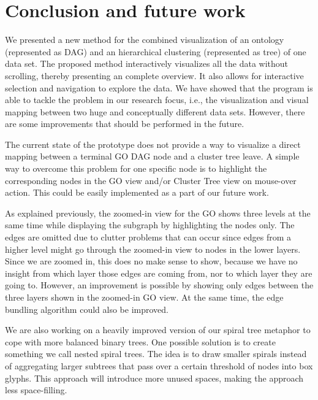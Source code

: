 \section{Conclusion and future work}
\label{sec:conclusion}

We presented a new method for the combined visualization of an ontology (represented as DAG) and an hierarchical clustering (represented as tree) of one data set. The proposed method interactively visualizes all the data without scrolling, thereby presenting an complete overview. It also allows for interactive selection and navigation to explore the data. We have showed that the program is able to tackle the problem in our research focus, i.e., the visualization and visual mapping between two huge and conceptually different data sets. However, there are some improvements that should be performed in the future.

The current state of the prototype does not provide a way to visualize a direct mapping between a terminal GO DAG node and a cluster tree leave. A simple way to overcome this problem for one specific node is to highlight the corresponding nodes in the GO view and/or Cluster Tree view on mouse-over action. This could be easily implemented as a part of our future work.

As explained previously, the zoomed-in view for the GO shows three levels at the same time while displaying the subgraph by highlighting the nodes only. The edges are omitted due to clutter problems that can occur since edges from a higher level might go through the zoomed-in view to nodes in the lower layers. Since we are zoomed in, this does no make sense to show, because we have no insight from which layer those edges are coming from, nor to which layer they are going to. However, an improvement is possible by showing only edges between the three layers shown in the zoomed-in GO view. At the same time, the edge bundling algorithm could also be improved.

We are also working on a heavily improved version of our spiral tree metaphor to cope with more balanced binary trees. One possible solution is to create something we call nested spiral trees. The idea is to draw smaller spirals instead of aggregating larger subtrees that pass over a certain threshold of nodes into box glyphs. This approach will introduce more unused spaces, making the approach less space-filling.